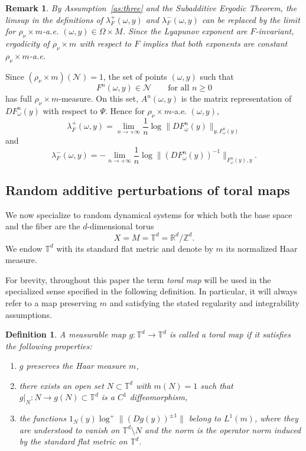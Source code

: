 \documentclass[a4paper,12pt,reqno]{amsart}
\numberwithin{equation}{section}
\newtheorem{remark}[theorem]{Remark}
\newtheorem{defn}[theorem]{Definition}
\newcommand{\cal}{\mathcal}
\newcommand{\NN}{{\cal N}}
\newcommand{\Rr}{{\mathbb{R}}}
\newcommand{\Tt}{{\mathbb{T}}}
\newcommand{\Zz}{{\mathbb{Z}}}
\begin{document}
\begin{remark}
By Assumption~\ref{as:three} and the Subadditive Ergodic Theorem, the limsup in the definitions of $\lambda_F^+(\omega,y)$ and $\lambda_F^-(\omega,y)$ can be replaced by the limit for $\rho_\nu\times m$-a.e. $(\omega,y)\in\Omega\times M$. Since the Lyapunov exponent are $F$-invariant, ergodicity of
$\rho_\nu\times m$ with respect to $F$ implies that both exponents are constant $\rho_\nu\times m$-a.e.
\end{remark}

Since $(\rho_{\nu} \times m)(\NN)=1$, the set of points $(\omega,y)$ such that
\[
F^n(\omega,y) \in \NN
\qquad\text{for all } n\ge 0
\]
has full $\rho_\nu\times m$-measure. On this set, $A^n(\omega,y)$ is the matrix representation of $DF_\omega^n(y)$ with respect to $\Psi$. Hence for $\rho_\nu\times m$-a.e. $(\omega,y)$, 
\[
\lambda_F^+(\omega,y)
=
\lim_{n\to+\infty}
\frac1n\log\|DF_\omega^n(y)\|_{y,F_\omega^n(y)}
\]
and
\[
\lambda_F^-(\omega,y)
=
-\lim_{n\to+\infty}
\frac1n\log\|(DF_\omega^n(y))^{-1}\|_{F_\omega^n(y),y}.
\]

\subsection{Random additive perturbations of toral maps}
\label{random additive}

We now specialize to random dynamical systems for which both the base space
and the fiber are the $d$-dimensional torus
\[
X=M=\Tt^d=\Rr^d/\Zz^d.
\]
We endow $\Tt^d$ with its standard flat metric and denote by $m$ its normalized Haar measure.

For brevity, throughout this paper the term \emph{toral map} will be used in the specialized sense specified in the following definition. In particular, it will always refer to a map preserving $m$ and satisfying the stated regularity and integrability assumptions.

\begin{defn}
\label{def:toral_map}
A measurable map $g\colon\Tt^d\to\Tt^d$ is called a \emph{toral map} if it satisfies the following properties:
\begin{enumerate}
\item $g$ preserves the Haar measure $m$, 
\item there exists an open set $N\subset\Tt^d$ with $m(N)=1$ such that $g|_N\colon N\to g(N) \subset \Tt^d$
is a $C^1$ diffeomorphism,
\item the functions $1_N(y)\log^+\|(Dg(y))^{\pm 1}\|$  belong to $L^1(m)$, where they are understood to vanish on $\Tt^d\setminus N$ and the norm is the operator norm induced by the
standard flat metric on $\Tt^d$. 
\end{enumerate}
\end{defn}
\end{document}
